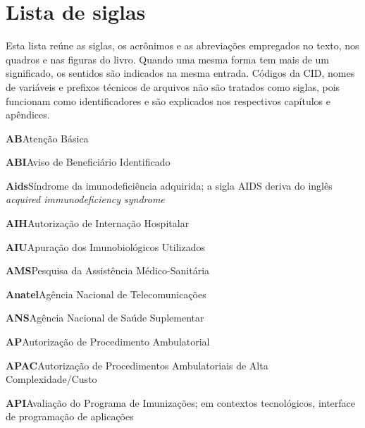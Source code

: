 \chapter*{Lista de siglas}
\begingroup
\setlength{\parindent}{0pt}
\setlength{\parskip}{0pt}
Esta lista reúne as siglas, os acrônimos e as abreviações empregados no texto, nos quadros e nas figuras do livro. Quando uma mesma forma tem mais de um significado, os sentidos são indicados na mesma entrada. Códigos da CID, nomes de variáveis e prefixos técnicos de arquivos não são tratados como siglas, pois funcionam como identificadores e são explicados nos respectivos capítulos e apêndices.\par\medskip
\noindent\textbf{AB}\hspace{1em}Atenção Básica\par\smallskip
\noindent\textbf{ABI}\hspace{1em}Aviso de Beneficiário Identificado\par\smallskip
\noindent\textbf{Aids}\hspace{1em}Síndrome da imunodeficiência adquirida; a sigla AIDS deriva do inglês \emph{acquired immunodeficiency syndrome}\par\smallskip
\noindent\textbf{AIH}\hspace{1em}Autorização de Internação Hospitalar\par\smallskip
\noindent\textbf{AIU}\hspace{1em}Apuração dos Imunobiológicos Utilizados\par\smallskip
\noindent\textbf{AMS}\hspace{1em}Pesquisa da Assistência Médico-Sanitária\par\smallskip
\noindent\textbf{Anatel}\hspace{1em}Agência Nacional de Telecomunicações\par\smallskip
\noindent\textbf{ANS}\hspace{1em}Agência Nacional de Saúde Suplementar\par\smallskip
\noindent\textbf{AP}\hspace{1em}Autorização de Procedimento Ambulatorial\par\smallskip
\noindent\textbf{APAC}\hspace{1em}Autorização de Procedimentos Ambulatoriais de Alta Complexidade/Custo\par\smallskip
\noindent\textbf{API}\hspace{1em}Avaliação do Programa de Imunizações; em contextos tecnológicos, interface de programação de aplicações\par\smallskip
